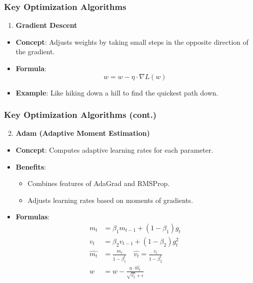 \documentclass[aspectratio=169]{beamer}
\begin{document}
\begin{frame}[fragile]
    \frametitle{Key Optimization Algorithms}
    \begin{enumerate}
        \item \textbf{Gradient Descent}
    \end{enumerate}
    \begin{itemize}
        \item \textbf{Concept}: Adjusts weights by taking small steps in the opposite direction of the gradient.
        \item \textbf{Formula}:
        \begin{equation}
            w = w - \eta \cdot \nabla L(w)
        \end{equation}
        \item \textbf{Example}: Like hiking down a hill to find the quickest path down.
    \end{itemize}
\end{frame}

\begin{frame}[fragile]
    \frametitle{Key Optimization Algorithms (cont.)}
    \begin{enumerate}
        \setcounter{enumi}{1}
        \item \textbf{Adam (Adaptive Moment Estimation)}
    \end{enumerate}
    \begin{itemize}
        \item \textbf{Concept}: Computes adaptive learning rates for each parameter.
        \item \textbf{Benefits}:
        \begin{itemize}
            \item Combines features of AdaGrad and RMSProp.
            \item Adjusts learning rates based on moments of gradients.
        \end{itemize}
        \item \textbf{Formulas}:
        \begin{align}
            m_t & = \beta_1 m_{t-1} + (1 - \beta_1) g_t \\
            v_t & = \beta_2 v_{t-1} + (1 - \beta_2) g_t^2 \\
            \hat{m_t} & = \frac{m_t}{1 - \beta_1^t} \quad \hat{v_t} = \frac{v_t}{1 - \beta_2^t} \\
            w & = w - \frac{\eta \cdot \hat{m_t}}{\sqrt{\hat{v_t}} + \epsilon}
        \end{align}
    \end{itemize}
\end{frame}
\end{document}
